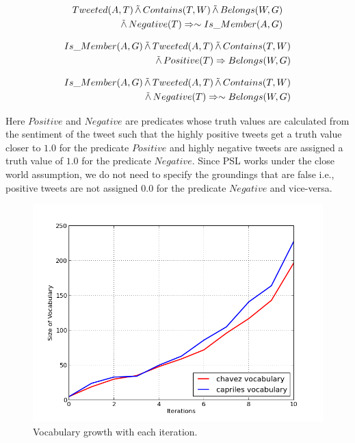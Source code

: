 \begin{align*}
\begin{split}
Tweeted(A,T)
	 \softand Contains(T,W)
	\softand Belongs(W,G)\\
	 \softand Negative(T)
	\Rightarrow \sim Is\_Member(A,G)
\end{split}
\end{align*}

\begin{align*}
\begin{split}
Is\_Member(A,G)
	 \softand Tweeted(A,T)
	\softand Contains(T,W)\\
	 \softand Positive(T) 
	\Rightarrow Belongs(W,G)
\end{split}
\end{align*}

\begin{align*}
\begin{split}
Is\_Member(A,G) 
	\softand Tweeted(A,T)
	\softand Contains(T,W)\\
	\softand Negative(T)
	\Rightarrow \sim Belongs(W,G)
\end{split}
\end{align*}

Here $Positive$ and $Negative$ are predicates whose truth values are calculated from the sentiment of the tweet such that the highly positive tweets get a truth value closer to $1.0$ for the predicate $Positive$ and highly negative tweets are assigned a truth value of $1.0$ for the predicate $Negative$. 
Since PSL works under the close world assumption, we do not need to specify the groundings that are false i.e., positive tweets are not assigned $0.0$ for the predicate $Negative$ and vice-versa.

\begin{figure}
	\centering
	\includegraphics[scale=0.50]{support_files/WordGrowth.png}
	\caption{Vocabulary growth with each iteration.}
	\label{fig:wordgrowth}
\end{figure}

